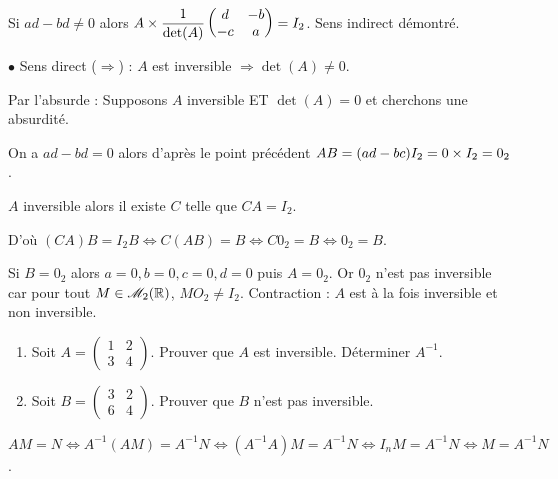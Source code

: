 \documentclass[10pt,a4paper]{article}
\begin{document}
Si $ad-bd \neq 0$ alors $A \times \dfrac{1}{\det(A)} \begin{pmatrix}   d&-b\\-c&a  \end{pmatrix} = I_2$. Sens indirect démontré.


$\bullet$ Sens direct ($\Rightarrow$) : $A$ est inversible $\Rightarrow \det(A) \neq 0$.

Par l'absurde : Supposons $A$ inversible ET $\det(A) = 0$ et cherchons une absurdité.

On a $ad-bd = 0$ alors d'après le point précédent $AB=(ad-bc) I_2=0 \times I_2 =0_2$. 

$A$ inversible alors il existe $C$ telle que $CA=I_2$.

D'où $(CA)B=I_2B \iff C(AB)=B \iff C 0_2 = B \iff 0_2 = B$.

Si $B=0_2$ alors $a=0,b=0,c=0,d=0$ puis $A=0_2$. Or $0_2$ n'est pas inversible car pour tout $M \in \mathcal{M}_{2}(\mathbb{R})$, $M O_2 \neq I_2$. Contraction : $A$ est à la fois inversible et non inversible.





\exes
\begin{enumerate}[$\bullet$]
\item Soit $A= \begin{pmatrix}   1&2\\3&4  \end{pmatrix}$. Prouver que $A$ est inversible. Déterminer $A^{-1}$. 
\item Soit $B= \begin{pmatrix}   3&2\\6&4  \end{pmatrix}$. Prouver que $B$ n'est pas inversible.

\end{enumerate} 






\dem $AM=N \iff A^{-1}(AM)=A^{-1}N \iff (A^{-1}A)M=A^{-1}N \iff I_nM=A^{-1}N \iff M=A^{-1}N$.
\end{document}
